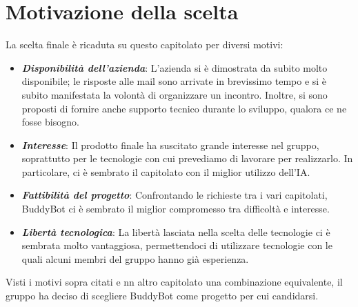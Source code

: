 \section{Motivazione della scelta}

La scelta finale è ricaduta su questo capitolato per diversi motivi:
\begin{itemize}
    \item \textit{\textbf{Disponibilità dell'azienda}}: L'azienda si è dimostrata da subito molto disponibile; le risposte alle mail sono arrivate in brevissimo tempo e si è subito manifestata la volontà di organizzare un incontro. Inoltre, si sono proposti di fornire anche supporto tecnico durante lo sviluppo, qualora ce ne fosse bisogno.
    \item \textit{\textbf{Interesse}}: Il prodotto finale ha suscitato grande interesse nel gruppo, soprattutto per le tecnologie con cui prevediamo di lavorare per realizzarlo. In particolare, ci è sembrato il capitolato con il miglior utilizzo dell'IA.
    \item \textit{\textbf{Fattibilità del progetto}}: Confrontando le richieste tra i vari capitolati, BuddyBot ci è sembrato il miglior compromesso tra difficoltà e interesse.
    \item \textit{\textbf{Libertà tecnologica}}: La libertà lasciata nella scelta delle tecnologie ci è sembrata molto vantaggiosa, permettendoci di utilizzare tecnologie con le quali alcuni membri del gruppo hanno già esperienza.
\end{itemize}

Visti i motivi sopra citati e nn altro capitolato una combinazione equivalente, 
il gruppo ha deciso di scegliere BuddyBot come progetto per cui candidarsi.